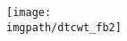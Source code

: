 \documentclass[tikz]{standalone}
\begin{document}
\def \path {dtcwt_scat}
\def \imgpath {dtcwt_scat/images}

% 
\begin{figure}
  \centering
  \texttt{[image: \\imgpath/dtcwt\_fb2]}
\end{figure}
\end{document}
